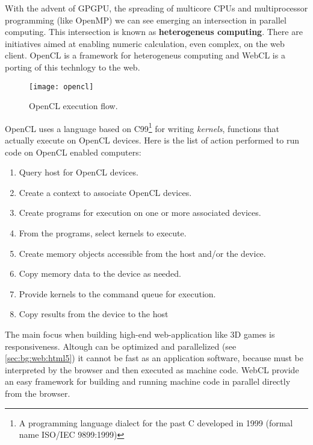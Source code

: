 
With the advent of \ac{GPGPU}, the spreading of multicore CPUs and multiprocessor
programming (like OpenMP) we can see emerging an intersection in parallel computing.
This intersection is known as \textbf{heterogeneus computing}. There are
initiatives aimed at enabling numeric calculation, even complex, on the web client.
\ac{OpenCL} is a framework for heterogeneus computing and \ac{WebCL} is a porting
of this technlogy to the web.\\

\begin{figure}[htb]
    \centering
    \texttt{[image: opencl]}
    \caption{OpenCL execution flow.}
    \label{fig:opencl}
\end{figure}
\ac{OpenCL} uses a language based on C99\footnote{A programming language dialect
for the past C developed in 1999 (formal name ISO/IEC 9899:1999)} for writing
\emph{kernels}, functions that actually execute on OpenCL devices. Here is the
list of action performed to run code on \ac{OpenCL} enabled computers:
\begin{enumerate}
    \item Query host for OpenCL devices.
    \item Create a context to associate OpenCL devices.
    \item Create programs for execution on one or more associated devices.
    \item From the programs, select kernels to execute.
    \item Create memory objects accessible from the host and/or the device.
    \item Copy memory data to the device as needed.
    \item Provide kernels to the command queue for execution.
    \item Copy results from the device to the host
\end{enumerate}


The main focus when building high-end web-application like 3D games is
responsiveness. Altough \js{} can be optimized and parallelized (see
\ref{sec:bg:web:html5}) it cannot be fast as an application software, because
\js{} must be interpreted by the browser and then executed as machine code.
\ac{WebCL} provide an easy framework for building and running machine code in
parallel directly from the browser.

